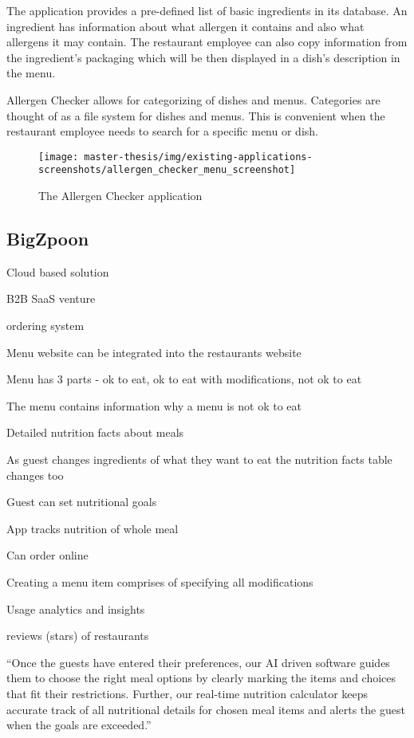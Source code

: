   The application provides a pre-defined list of basic ingredients in its database.
  An ingredient has information about what allergen it contains and also what allergens it may contain. 
  The restaurant employee can also copy information from the ingredient's packaging which will be then displayed in a dish's description in the menu.
  
  Allergen Checker allows for categorizing of dishes and menus. 
  Categories are thought of as a file system for dishes and menus.
  This is convenient when the restaurant employee needs to search for a specific menu or dish.

  \begin{figure}[h]
    \centering
    \texttt{[image: master-thesis/img/existing-applications-screenshots/allergen\_checker\_menu\_screenshot]}
    \caption{The Allergen Checker application}
  \end{figure}

\subsection*{BigZpoon}
  Cloud based solution

  B2B SaaS venture

  ordering system

  Menu website can be integrated into the restaurants website

  Menu has 3 parts - ok to eat, ok to eat with modifications, not ok to eat

  The menu contains information why a menu is not ok to eat

  Detailed nutrition facts about meals

  As guest changes ingredients of what they want to eat the nutrition facts table changes too

  Guest can set nutritional goals

  App tracks nutrition of whole meal

  Can order online

  Creating a menu item comprises of specifying all modifications

  Usage analytics and insights 

  reviews (stars) of restaurants

  “Once the guests have entered their preferences, our AI driven software guides them to choose the right meal options by clearly marking the items and choices that fit their restrictions.  Further, our real-time nutrition calculator keeps accurate track of all nutritional details for chosen meal items and alerts the guest when the goals are exceeded.”

